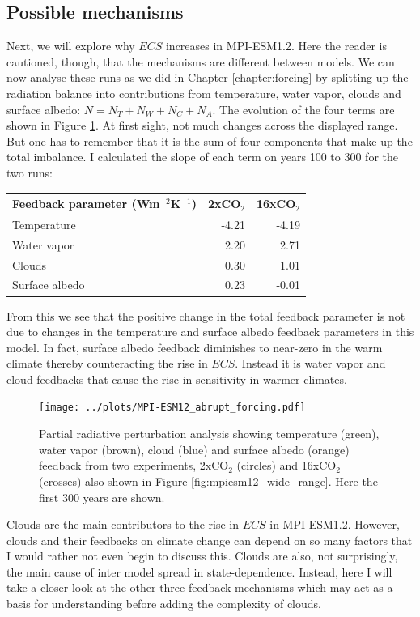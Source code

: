 \documentclass[12pt]{book}
\begin{document}
\subsection{Possible mechanisms}
Next, we will explore why $ECS$ increases in MPI-ESM1.2. Here the reader is cautioned, though, that the mechanisms are different between models. 
We can now  analyse these runs as we did in Chapter \ref{chapter:forcing} by splitting up the radiation balance into contributions from temperature, water vapor, clouds and surface albedo: $N=N_T+N_W+N_C+N_A$. The evolution of the four terms are shown in Figure \ref{fig:state_dependent_feedback_mpiesm12}. At first sight, not much changes across the displayed range. But one has to remember that it is the sum of four components that make up the total imbalance. I calculated the slope of each term on years 100 to 300 for the two runs:
\begin{center}
  \begin{tabular}{l|rr} 
Feedback parameter (Wm$^{-2}$K$^{-1}$) & 2xCO$_2$ & 16xCO$_2$  \\
\hline
Temperature     & -4.21  & -4.19 \\
Water vapor      & 2.20 & 2.71 \\
Clouds              & 0.30 & 1.01 \\
Surface albedo & 0.23 & -0.01
  \end{tabular}
\end{center}
From this we see that the positive change in the total feedback parameter is not due to changes in the temperature and surface albedo feedback parameters in this model. In fact, surface albedo feedback diminishes to near-zero in the warm climate thereby counteracting the rise in $ECS$. Instead it is water vapor and cloud feedbacks that cause the rise in sensitivity in warmer climates. 

\begin{figure}
\begin{center}
\texttt{[image: ../plots/MPI-ESM12\_abrupt\_forcing.pdf]}
\end{center}
\caption{ Partial radiative perturbation analysis showing temperature (green), water vapor (brown), cloud (blue) and surface albedo (orange) feedback from two experiments, 2xCO$_2$ (circles) and 16xCO$_2$ (crosses) also shown in Figure \ref{fig:mpiesm12_wide_range}. Here the first 300 years are shown.   } 
\label{fig:state_dependent_feedback_mpiesm12}
\end{figure}

Clouds are the main contributors to the rise in $ECS$ in MPI-ESM1.2. However, clouds and their feedbacks on climate change can depend on so many factors that I would rather not even begin to discuss this. Clouds are also, not surprisingly, the main cause of inter model spread in state-dependence. Instead, here I will take a closer look at the other three feedback mechanisms which may act as a basis for understanding before adding the complexity of clouds.
\end{document}

